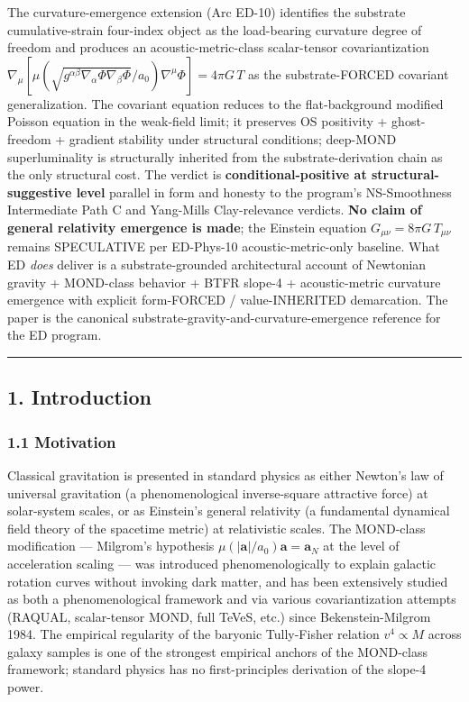 \documentclass[
]{article}
\begin{document}
The curvature-emergence extension (Arc ED-10) identifies the substrate
cumulative-strain four-index object as the load-bearing curvature degree
of freedom and produces an acoustic-metric-class scalar-tensor
covariantization
\(\nabla_\mu[\mu(\sqrt{g^{\alpha\beta}\nabla_\alpha\Phi\nabla_\beta\Phi}/a_0)\nabla^\mu\Phi] = 4\pi G\,T\)
as the substrate-FORCED covariant generalization. The covariant equation
reduces to the flat-background modified Poisson equation in the
weak-field limit; it preserves OS positivity + ghost-freedom + gradient
stability under structural conditions; deep-MOND superluminality is
structurally inherited from the substrate-derivation chain as the only
structural cost. The verdict is \textbf{conditional-positive at
structural-suggestive level} parallel in form and honesty to the
program's NS-Smoothness Intermediate Path C and Yang-Mills
Clay-relevance verdicts. \textbf{No claim of general relativity
emergence is made}; the Einstein equation
\(G_{\mu\nu} = 8\pi G\,T_{\mu\nu}\) remains SPECULATIVE per ED-Phys-10
acoustic-metric-only baseline. What ED \emph{does} deliver is a
substrate-grounded architectural account of Newtonian gravity +
MOND-class behavior + BTFR slope-4 + acoustic-metric curvature emergence
with explicit form-FORCED / value-INHERITED demarcation. The paper is
the canonical substrate-gravity-and-curvature-emergence reference for
the ED program.

\begin{center}\rule{0.5\linewidth}{0.5pt}\end{center}

\subsection{1. Introduction}\label{introduction}

\subsubsection{1.1 Motivation}\label{motivation}

Classical gravitation is presented in standard physics as either
Newton's law of universal gravitation (a phenomenological inverse-square
attractive force) at solar-system scales, or as Einstein's general
relativity (a fundamental dynamical field theory of the spacetime
metric) at relativistic scales. The MOND-class modification ---
Milgrom's hypothesis \(\mu(|\mathbf{a}|/a_0)\mathbf{a} = \mathbf{a}_N\)
at the level of acceleration scaling --- was introduced
phenomenologically to explain galactic rotation curves without invoking
dark matter, and has been extensively studied as both a phenomenological
framework and via various covariantization attempts (RAQUAL,
scalar-tensor MOND, full TeVeS, etc.) since Bekenstein-Milgrom 1984. The
empirical regularity of the baryonic Tully-Fisher relation
\(v^4 \propto M\) across galaxy samples is one of the strongest
empirical anchors of the MOND-class framework; standard physics has no
first-principles derivation of the slope-4 power.
\end{document}
